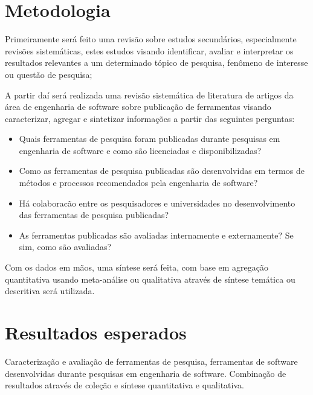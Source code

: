 \documentclass[12pt]{article}
\begin{document}
\section{Metodologia}

Primeiramente será feito uma revisão sobre estudos secundários, especialmente
revisões sistemáticas, estes estudos visando identificar, avaliar e interpretar os
resultados relevantes a um determinado tópico de pesquisa, fenômeno de
interesse ou questão de pesquisa;

A partir daí será realizada uma revisão sistemática de literatura de artigos
da área de engenharia de software sobre publicação de ferramentas visando
caracterizar, agregar e sintetizar informações a partir das seguintes
perguntas:

\begin{itemize}
  \item Quais ferramentas de pesquisa foram publicadas durante pesquisas em
    engenharia de software e como são licenciadas e disponibilizadas?
  \item Como as ferramentas de pesquisa publicadas são desenvolvidas em termos
    de métodos e processos recomendados pela engenharia de software?
  \item Há colaboracão entre os pesquisadores e universidades no
    desenvolvimento das ferramentas de pesquisa publicadas?
  \item As ferramentas publicadas são avaliadas internamente e externamente?
    Se sim, como são avaliadas?
\end{itemize}

Com os dados em mãos, uma síntese será feita, com base em agregação
quantitativa usando meta-análise ou qualitativa através de síntese temática ou
descritiva será utilizada.

\section{Resultados esperados}

Caracterização e avaliação de ferramentas de pesquisa, ferramentas de software
desenvolvidas durante pesquisas em engenharia de software. Combinação de
resultados através de coleção e síntese quantitativa e qualitativa.


\end{document}
